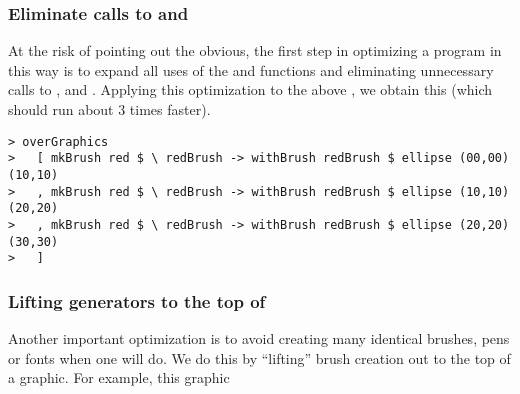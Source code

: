 % 
% 
% 
% 


\subsubsection{Eliminate calls to  and }

At the risk of pointing out the obvious, the first step in optimizing
a program in this way is to expand all uses of the  and
 functions and eliminating unnecessary calls to
,  and .  Applying this
optimization to the above , we obtain this (which should run
about 3 times faster).

\begin{verbatim}
> overGraphics
>   [ mkBrush red $ \ redBrush -> withBrush redBrush $ ellipse (00,00) (10,10)
>   , mkBrush red $ \ redBrush -> withBrush redBrush $ ellipse (10,10) (20,20)
>   , mkBrush red $ \ redBrush -> withBrush redBrush $ ellipse (20,20) (30,30)
>   ]
\end{verbatim}

\subsubsection{Lifting generators to the top of }


Another important optimization is to avoid creating many identical
brushes, pens or fonts when one will do.  We do this by ``lifting''
brush creation out to the top of a graphic.  For example, this graphic

